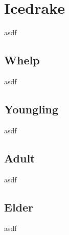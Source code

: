 \section{Icedrake}

asdf

\subsection{Whelp}

asdf

\subsection{Youngling}

asdf

\subsection{Adult}

asdf

\subsection{Elder}

asdf
